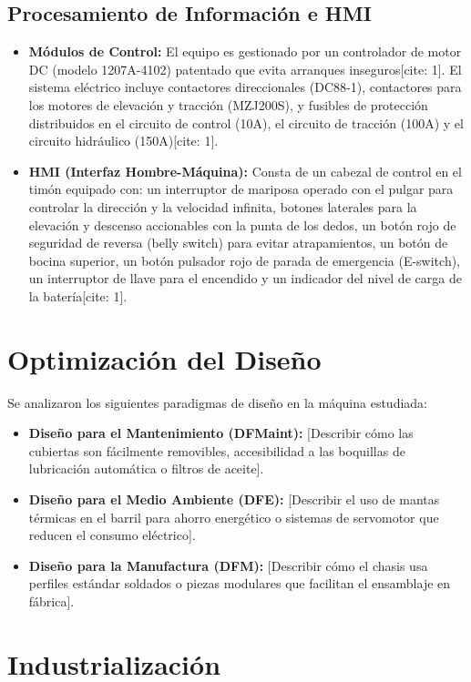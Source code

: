 \documentclass[11pt, a4paper]{article}
\begin{document}
\subsection{Procesamiento de Información e HMI}
\begin{itemize}
    \item \textbf{Módulos de Control:} El equipo es gestionado por un controlador de motor DC (modelo 1207A-4102) patentado que evita arranques inseguros[cite: 1]. El sistema eléctrico incluye contactores direccionales (DC88-1), contactores para los motores de elevación y tracción (MZJ200S), y fusibles de protección distribuidos en el circuito de control (10A), el circuito de tracción (100A) y el circuito hidráulico (150A)[cite: 1].
    \item \textbf{HMI (Interfaz Hombre-Máquina):} Consta de un cabezal de control en el timón equipado con: un interruptor de mariposa operado con el pulgar para controlar la dirección y la velocidad infinita, botones laterales para la elevación y descenso accionables con la punta de los dedos, un botón rojo de seguridad de reversa (belly switch) para evitar atrapamientos, un botón de bocina superior, un botón pulsador rojo de parada de emergencia (E-switch), un interruptor de llave para el encendido y un indicador del nivel de carga de la batería[cite: 1].
\end{itemize}

\section{Optimización del Diseño}
Se analizaron los siguientes paradigmas de diseño en la máquina estudiada:

\begin{itemize}
    \item \textbf{Diseño para el Mantenimiento (DFMaint):} [Describir cómo las cubiertas son fácilmente removibles, accesibilidad a las boquillas de lubricación automática o filtros de aceite].
    \item \textbf{Diseño para el Medio Ambiente (DFE):} [Describir el uso de mantas térmicas en el barril para ahorro energético o sistemas de servomotor que reducen el consumo eléctrico].
    \item \textbf{Diseño para la Manufactura (DFM):} [Describir cómo el chasis usa perfiles estándar soldados o piezas modulares que facilitan el ensamblaje en fábrica].
\end{itemize}

\section{Industrialización}
\end{document}
